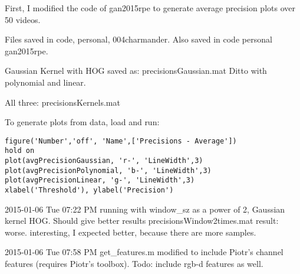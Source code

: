 First, I modified the code of gan2015rpe to generate average precision plots
over 50 videos.

Files saved in code, personal, 004charmander.
Also saved in code personal gan2015rpe.

Gaussian Kernel with HOG saved as: precisionsGaussian.mat
Ditto with polynomial and linear.

All three: precisionsKernels.mat

To generate plots from data, load and run:
\begin{lstlisting}
figure('Number','off', 'Name',['Precisions - Average'])
hold on
plot(avgPrecisionGaussian, 'r-', 'LineWidth',3)
plot(avgPrecisionPolynomial, 'b-', 'LineWidth',3)
plot(avgPrecisionLinear, 'g-', 'LineWidth',3)
xlabel('Threshold'), ylabel('Precision')
\end{lstlisting}

2015-01-06 Tue 07:22 PM
running with window\_sz as a power of 2, Gaussian kernel HOG. Should give better results
precisionsWindow2times.mat
result: worse. interesting, I expected better, because there are more samples.

2015-01-06 Tue 07:58 PM
get\_features.m modified to include Piotr's channel features (requires Piotr's toolbox). Todo: include rgb-d
features as well.

